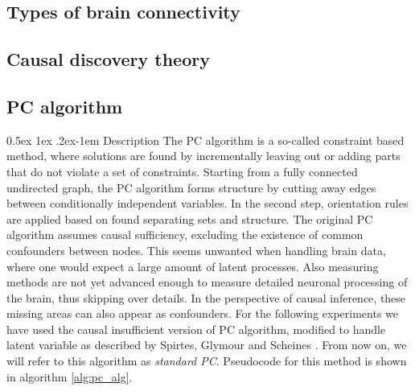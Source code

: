 \documentclass[a4paper, 10pt, english, onecolumn]{article}
\makeatletter
\renewcommand{\paragraph}{%
  \@startsection{paragraph}{4}%
  {\z@}{0.5ex \@plus 1ex \@minus .2ex}{-1em}%
  {\normalfont\normalsize\bfseries}%
}
\makeatother
\begin{document}
\subsection{Types of brain connectivity}%

\subsection{Causal discovery theory}

\subsection{PC algorithm}
\paragraph{Description}
The PC algorithm is a so-called constraint based method, where solutions are found by incrementally leaving out or adding parts that do not violate a set of constraints.
Starting from a fully connected undirected graph, the PC algorithm forms structure by cutting away edges between conditionally independent variables.
In the second step, orientation rules are applied based on found separating sets and structure.
The original PC algorithm assumes causal sufficiency, excluding the existence of common confounders between nodes.
This seems unwanted when handling brain data, where one would expect a large amount of latent processes.
Also measuring methods are not yet advanced enough to measure detailed neuronal processing of the brain, thus skipping over details.
In the perspective of causal inference, these missing areas can also appear as confounders.
For the following experiments we have used the causal insufficient version of PC algorithm, modified to handle latent variable as described by Spirtes, Glymour and Scheines \cite[p.165-167]{spirtes2000}.
From now on, we will refer to this algorithm as \textit{standard PC}.
Pseudocode for this method is shown in algorithm \ref{alg:pc_alg}.
\end{document}
